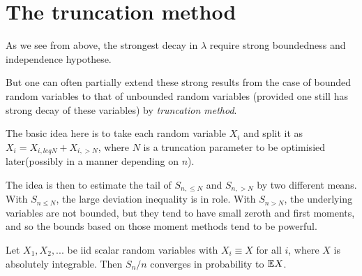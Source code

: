 \section{The truncation method}

As we see from above, the strongest decay in $\lambda$ require strong boundedness and independence hypothese.

But one can often partially extend these strong results from the case of bounded random variables to that of unbounded random variables (provided one still has strong decay of these variables) by \textit{truncation method}.

The basic idea here is to take each random variable $X_i$ and split it as $X_i=X_{i,leq N} + X_{i,> N}$, where $N$ is a truncation parameter to be optimisied later(possibly in a manner depending on $n$). 

The idea is then to estimate the tail of $S_{n,\leq N}$ and $S_{n,>N}$ by two different means. With $S_{n\leq N}$, the large deviation inequality is in role. With $S_{n>N}$, the underlying variables are not bounded, but they tend to have small zeroth and first moments, and so the bounds based on those moment methods tend to be powerful. 

\begin{theorem}
    Let $X_1,X_2,...$ be iid scalar random variables with $X_i \equiv X$ for all $i$, where $X$ is absolutely integrable. Then $S_n/n$ converges in probability to $\mathbb{E} X$.
\end{theorem}

